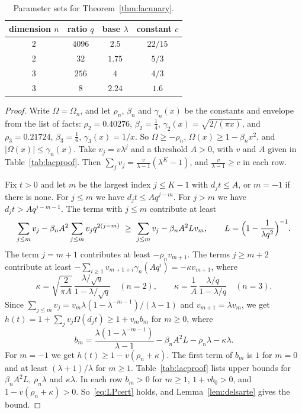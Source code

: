 \documentclass[11pt]{amsart}
\theoremstyle{definition}
\begin{document}
\begin{table}[!ht]
\centering
\begin{tabular}{cccc}
\toprule
dimension $n$ & ratio $q$ & base $\lambda$ & constant $c$\\
\midrule
$2$ & $4096$ & $2.5$ & $22/15$\\
$2$ & $32$ & $1.75$ & $5/3$\\
$3$ & $256$ & $4$ & $4/3$\\
$3$ & $8$ & $2.24$ & $1.6$\\
\bottomrule
\end{tabular}
\caption{Parameter sets for Theorem~\ref{thm:lacunary}.}\label{tab:lac}
\end{table}

\begin{proof}
Write $\Omega=\Omega_n$, and let $\rho_n$, $\beta_n$ and $\gamma_n(x)$ be the constants and envelope from the list of facts: $\rho_2=0.40276$, $\beta_2=\frac14$, $\gamma_2(x)=\sqrt{2/(\pi x)}$, and $\rho_3=0.21724$, $\beta_3=\frac16$, $\gamma_3(x)=1/x$. So $\Omega\ge-\rho_n$, $\Omega(x)\ge1-\beta_nx^2$, and $|\Omega(x)|\le\gamma_n(x)$. Take $v_j=v\lambda^j$ and a threshold $A>0$, with $v$ and $A$ given in Table~\ref{tab:lacproof}. Then $\sum_jv_j=\frac{v}{\lambda-1}(\lambda^K-1)$, and $\frac{v}{\lambda-1}\ge c$ in each row.

Fix $t>0$ and let $m$ be the largest index $j\le K-1$ with $d_jt\le A$, or $m=-1$ if there is none. For $j\le m$ we have $d_jt\le Aq^{j-m}$. For $j>m$ we have $d_jt>Aq^{j-m-1}$. The terms with $j\le m$ contribute at least
\[
\sum_{j\le m}v_j-\beta_nA^2\sum_{j\le m}v_jq^{2(j-m)}\ \ge\ \sum_{j\le m}v_j-\beta_nA^2Lv_m,\qquad L=\Bigl(1-\frac1{\lambda q^2}\Bigr)^{-1}.
\]
The term $j=m+1$ contributes at least $-\rho_nv_{m+1}$. The terms $j\ge m+2$ contribute at least $-\sum_{i\ge1}v_{m+1+i}\gamma_n(Aq^i)=-\kappa v_{m+1}$, where
\[
\kappa=\sqrt{\frac2{\pi A}}\,\frac{\lambda/\sqrt q}{1-\lambda/\sqrt q}\quad(n=2),\qquad \kappa=\frac1A\,\frac{\lambda/q}{1-\lambda/q}\quad(n=3).
\]
Since $\sum_{j\le m}v_j=v_m\lambda(1-\lambda^{-m-1})/(\lambda-1)$ and $v_{m+1}=\lambda v_m$, we get $h(t)=1+\sum_jv_j\Omega(d_jt)\ge1+v_mb_m$ for $m\ge0$, where
\[
b_m=\frac{\lambda(1-\lambda^{-m-1})}{\lambda-1}-\beta_nA^2L-\rho_n\lambda-\kappa\lambda .
\]
For $m=-1$ we get $h(t)\ge1-v(\rho_n+\kappa)$. The first term of $b_m$ is $1$ for $m=0$ and at least $(\lambda+1)/\lambda$ for $m\ge1$. Table~\ref{tab:lacproof} lists upper bounds for $\beta_nA^2L$, $\rho_n\lambda$ and $\kappa\lambda$. In each row $b_m>0$ for $m\ge1$, $1+vb_0>0$, and $1-v(\rho_n+\kappa)>0$. So~\eqref{eq:LPcert} holds, and Lemma~\ref{lem:delsarte} gives the bound.
\end{proof}
\end{document}
